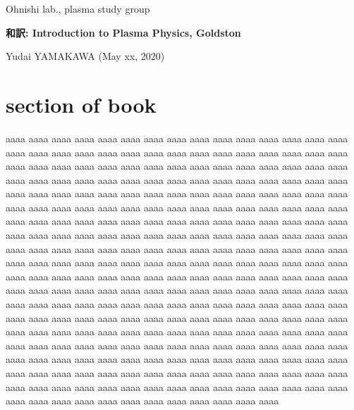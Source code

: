 \documentclass[a4j,10pt,dvipdfmx]{jsarticle}
\begin{document}
%
%
%
\noindent
{\footnotesize
Ohnishi lab., plasma study group
}

\noindent
	\textbf{\Large
		和訳: Introduction to Plasma Physics, Goldston
	}

	\vspace{1ex}

\noindent
	\textrm{\small 
		Yudai YAMAKAWA (May xx, 2020)
	}



\vspace{4ex}


\section{section of book}
%
aaaa aaaa aaaa aaaa aaaa aaaa aaaa aaaa aaaa aaaa aaaa 
aaaa aaaa aaaa aaaa aaaa aaaa aaaa aaaa aaaa aaaa aaaa 
aaaa aaaa aaaa aaaa aaaa aaaa aaaa aaaa aaaa aaaa aaaa 
aaaa aaaa aaaa aaaa aaaa aaaa aaaa aaaa aaaa aaaa aaaa 
aaaa aaaa aaaa aaaa aaaa aaaa aaaa aaaa aaaa aaaa aaaa 
aaaa aaaa aaaa aaaa aaaa aaaa aaaa aaaa aaaa aaaa aaaa 
aaaa aaaa aaaa aaaa aaaa aaaa aaaa aaaa aaaa aaaa aaaa 
aaaa aaaa aaaa aaaa aaaa aaaa aaaa aaaa aaaa aaaa aaaa 
aaaa aaaa aaaa aaaa aaaa aaaa aaaa aaaa aaaa aaaa aaaa 
aaaa aaaa aaaa aaaa aaaa aaaa aaaa aaaa aaaa aaaa aaaa 
aaaa aaaa aaaa aaaa aaaa aaaa aaaa aaaa aaaa aaaa aaaa 
aaaa aaaa aaaa aaaa aaaa aaaa aaaa aaaa aaaa aaaa aaaa 
aaaa aaaa aaaa aaaa aaaa aaaa aaaa aaaa aaaa aaaa aaaa 
aaaa aaaa aaaa aaaa aaaa aaaa aaaa aaaa aaaa aaaa aaaa 
aaaa aaaa aaaa aaaa aaaa aaaa aaaa aaaa aaaa aaaa aaaa 
aaaa aaaa aaaa aaaa aaaa aaaa aaaa aaaa aaaa aaaa aaaa 
aaaa aaaa aaaa aaaa aaaa aaaa aaaa aaaa aaaa aaaa aaaa 
aaaa aaaa aaaa aaaa aaaa aaaa aaaa aaaa aaaa aaaa aaaa 
aaaa aaaa aaaa aaaa aaaa aaaa aaaa aaaa aaaa aaaa aaaa 
aaaa aaaa aaaa aaaa aaaa aaaa aaaa aaaa aaaa aaaa aaaa 
aaaa aaaa aaaa aaaa aaaa aaaa aaaa aaaa aaaa aaaa aaaa 
aaaa aaaa aaaa aaaa aaaa aaaa aaaa aaaa aaaa aaaa aaaa 
aaaa aaaa aaaa aaaa aaaa aaaa aaaa aaaa aaaa aaaa aaaa 
aaaa aaaa aaaa aaaa aaaa aaaa aaaa aaaa aaaa aaaa aaaa 
aaaa aaaa aaaa aaaa aaaa aaaa aaaa aaaa aaaa aaaa aaaa 
aaaa aaaa aaaa aaaa aaaa aaaa aaaa aaaa aaaa aaaa aaaa 
aaaa aaaa aaaa aaaa aaaa aaaa aaaa aaaa aaaa aaaa aaaa 
\end{document}
